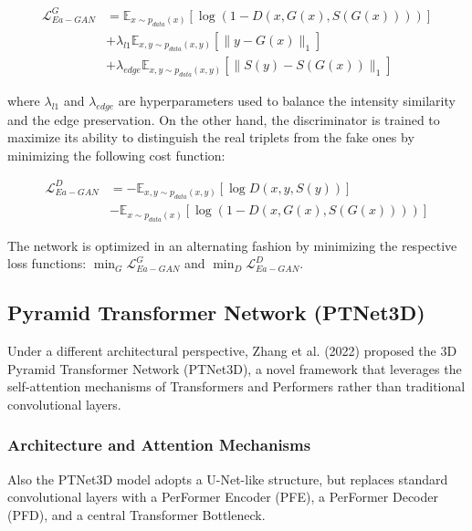 \documentclass[11pt,a4paper]{article}
\begin{document}
\begin{equation}
\begin{split}
    \mathcal{L}_{Ea-GAN}^{G} &= \mathbb{E}_{x \sim p_{data}(x)}[\log(1 - D(x, G(x), S(G(x))))] \\
    &+ \lambda_{l1}\mathbb{E}_{x, y \sim p_{data}(x,y)}[\lVert y - G(x) \rVert_1] \\
    &+ \lambda_{edge}\mathbb{E}_{x, y \sim p_{data}(x,y)}[\lVert S(y) - S(G(x)) \rVert_1]
\end{split}
\end{equation}

where $\lambda_{l1}$ and $\lambda_{edge}$ are hyperparameters used to balance the intensity similarity and the edge preservation. On the other hand, the discriminator is trained to maximize its ability to distinguish the real triplets from the fake ones by minimizing the following cost function:

\begin{equation}
\begin{split}
    \mathcal{L}_{Ea-GAN}^{D} &= -\mathbb{E}_{x, y \sim p_{data}(x,y)}[\log D(x, y, S(y))] \\
    &- \mathbb{E}_{x \sim p_{data}(x)}[\log(1 - D(x, G(x), S(G(x))))]
\end{split}
\end{equation}

The network is optimized in an alternating fashion by minimizing the respective loss functions: $\min_G \mathcal{L}_{Ea-GAN}^{G}$ and $\min_D \mathcal{L}_{Ea-GAN}^{D}$.

\subsection{Pyramid Transformer Network (PTNet3D)}

Under a different architectural perspective, Zhang et al. (2022) \cite{ptnet3d} proposed the 3D Pyramid Transformer Network (PTNet3D), a novel framework that leverages the self-attention mechanisms of Transformers and Performers rather than traditional convolutional layers.

\subsubsection{Architecture and Attention Mechanisms}
Also the PTNet3D model adopts a U-Net-like structure, but replaces standard convolutional layers with a PerFormer Encoder (PFE), a PerFormer Decoder (PFD), and a central Transformer Bottleneck. 
\end{document}
